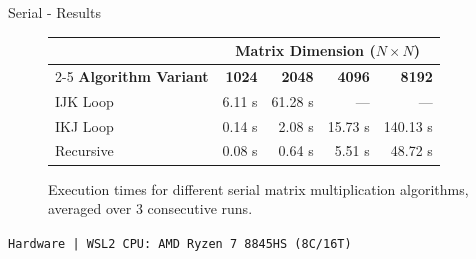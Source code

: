 \begin{frame}{Serial - Results}
    
    \vspace{0.3cm}
    \centering
    \small
    \begin{figure}
    \begin{tabular}{lrrrr}
        \toprule
        & \multicolumn{4}{c}{\textbf{Matrix Dimension ($N \times N$)}} \\
        \cmidrule(lr){2-5}
        \textbf{Algorithm Variant} & \textbf{1024} & \textbf{2048} & \textbf{4096} & \textbf{8192} \\
        \midrule
        IJK Loop          & 6.11 s        & 61.28 s       & ---           & ---      \\
        IKJ Loop          & 0.14 s        & 2.08 s        & 15.73 s       & 140.13 s \\
        Recursive         & 0.08 s        & 0.64 s        & 5.51 s        & 48.72  s \\
        \bottomrule
    \end{tabular}
    \caption{Execution times for different serial matrix multiplication algorithms, averaged over 3 consecutive runs.}
    \end{figure}

    \begin{center}
        \fontsize{6.5pt}{7.5pt}\selectfont
        \texttt{Hardware | WSL2 \quad  CPU: AMD Ryzen 7 8845HS (8C/16T)}
    \end{center}
    
\end{frame}